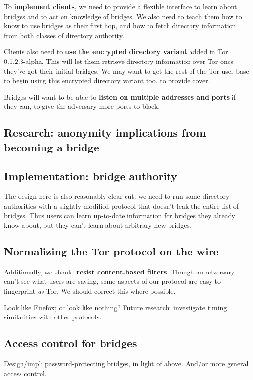 \documentclass{article}
\begin{document}
To {\bf implement clients}, we need to provide a flexible interface to
learn about bridges and to act on knowledge of bridges. We also need
to teach them how to know to use bridges as their first hop, and how to
fetch directory information from both classes of directory authority.

Clients also need to {\bf use the encrypted directory variant} added in Tor
0.1.2.3-alpha.  This will let them retrieve directory information over Tor
once they've got their initial bridges. We may want to get the rest of the
Tor user base to begin using this encrypted directory variant too, to
provide cover.

Bridges will want to be able to {\bf listen on multiple addresses and ports}
if they can, to give the adversary more ports to block.

\subsection{Research: anonymity implications from becoming a bridge}

\subsection{Implementation: bridge authority}

The design here is also reasonably clear-cut: we need to run some
directory authorities with a slightly modified protocol that doesn't leak
the entire list of bridges. Thus users can learn up-to-date information
for bridges they already know about, but they can't learn about arbitrary
new bridges.

\subsection{Normalizing the Tor protocol on the wire}
Additionally, we should {\bf resist content-based filters}.  Though an
adversary can't see what users are saying, some aspects of our protocol are
easy to fingerprint {\em as} Tor.  We should correct this where possible.

Look like Firefox; or look like nothing?
Future research: investigate timing similarities with other protocols.

\subsection{Access control for bridges}
Design/impl: password-protecting bridges, in light of above.
And/or more general access control.
\end{document}

